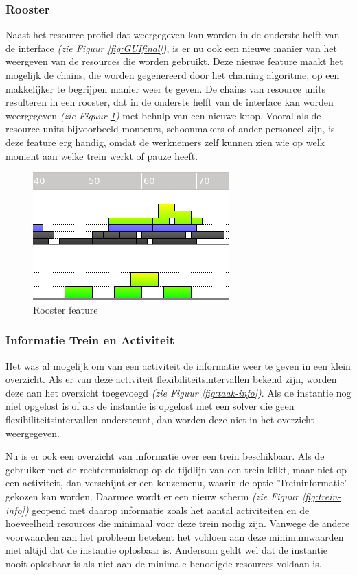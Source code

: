 \subsubsection{Rooster}
Naast het resource profiel dat weergegeven kan worden in de onderste helft van de interface \emph{(zie Figuur \ref{fig:GUIfinal})}, is er nu ook een nieuwe manier van het weergeven van de resources die worden gebruikt. Deze nieuwe feature maakt het mogelijk de chains, die worden gegenereerd door het chaining algoritme, op een makkelijker te begrijpen manier weer te geven. De chains van resource units resulteren in een rooster, dat in de onderste helft van de interface kan worden weergegeven \emph{(zie Figuur \ref{fig:rooster})} met behulp van een nieuwe knop. Vooral als de resource units bijvoorbeeld monteurs, schoonmakers of ander personeel zijn, is deze feature erg handig, omdat de werknemers zelf kunnen zien wie op welk moment aan welke trein werkt of pauze heeft. 

\begin{figure}[H]
\center
\includegraphics[width=.5\textwidth]{../images/rooster.png}
\caption{Rooster feature}
\label{fig:rooster}
\end{figure}

\subsubsection{Informatie Trein en Activiteit}
Het was al mogelijk om van een activiteit de informatie weer te geven in een klein overzicht. Als er van deze activiteit flexibiliteitsintervallen bekend zijn, worden deze aan het overzicht toegevoegd \emph{(zie Figuur \ref{fig:taak-info})}. Als de instantie nog niet opgelost is of als de instantie is opgelost met een solver die geen flexibiliteitsintervallen ondersteunt, dan worden deze niet in het overzicht weergegeven.  

Nu is er ook een overzicht van informatie over een trein beschikbaar. Als de gebruiker met de rechtermuisknop op de tijdlijn van een trein klikt, maar niet op een activiteit, dan verschijnt er een keuzemenu, waarin de optie 'Treininformatie' gekozen kan worden. Daarmee wordt er een nieuw scherm \emph{(zie Figuur \ref{fig:trein-info})} geopend met daarop informatie zoals het aantal activiteiten en de hoeveelheid resources die minimaal voor deze trein nodig zijn. Vanwege de andere voorwaarden aan het probleem betekent het voldoen aan deze minimumwaarden niet altijd dat de instantie oplosbaar is. Andersom geldt wel dat de instantie nooit oplosbaar is als niet aan de minimale benodigde resources voldaan is.

